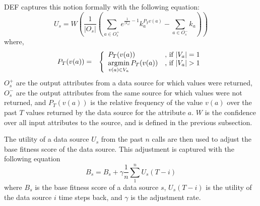 DEF captures this notion formally with the following equation:
%
%
\begin{equation}
	U_s = W \left( \frac{1}{|O_s|} \left( \displaystyle\sum\limits_{a \in O_s^+} e^{\frac{1}{|V_a|} - 1}k_a^{P_Tv(a)} - \displaystyle\sum\limits_{a \in O_s^-}k_a \right) \right) \nonumber
\end{equation}
where,
\begin{eqnarray}
	P_T(v(a)) &=& \left\lbrace \begin{array}{ll} P_T (v(a)) & \mbox{, if } |V_a|= 1 \\ \operatorname*{\arg\!\min}\limits_{v(a) \in V_a} P_T(v(a)) & \mbox{, if } |V_a| > 1 \end{array} \right.
\end{eqnarray}
$O_s^+$ are the output attributes from a data source for which values were returned, $O_s^-$ 
are the output attributes from the same source for which values were not returned, and $P_T(v(a))$
is the relative frequency of the value $v(a)$ over the past $T$ values returned by the data source for 
the attribute $a$. $W$ is the confidence over all input attributes to the source, and is defined
in the previous subsection.

The utility of a data source $U_s$ from the past $n$ calls are then used to adjust the base fitness score 
of the data source. This adjustment is captured with the following equation
\begin{equation}
 B_s= B_s + \gamma \frac{1}{n} \displaystyle\sum\limits_{1}^{n}U_s(T - i)
\end{equation}
where $B_s$ is the base fitness score of a data source $s$, $U_s(T-i)$ is the utility of the data source $i$ time steps
back, and $\gamma$ is the adjustment rate.

%
%
%
